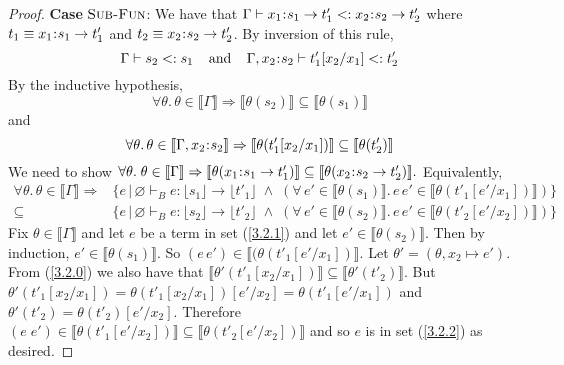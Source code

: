 \documentclass[11pt]{article}
\newcommand{\bind}{\hspace{0.05em}{:}\hspace{0.05em}} %
\newcommand{\lb}{\llbracket}         %
\newcommand{\rb}{\rrbracket}         %
\begin{document}
\begin{proof}
{\bf Case} $\textsc{Sub-Fun}$: We have that
$\Gamma \vdash x_1\bind s_1 \rightarrow t'_1 <: x_2\bind s_2 \rightarrow t'_2$ where $t_1 \equiv x_1\bind s_1 \rightarrow t'_1$ and $t_2 \equiv x_2\bind s_2 \rightarrow t'_2$. By inversion of this rule,
\[
\Gamma \vdash s_2 <: s_1 \;\;\;\;{\rm and}\;\;\;\;
\Gamma,x_2\bind s_2 \vdash t'_1[x_2/x_1] <: t'_2
\]
By the inductive hypothesis,
\[
\forall\theta.\, \theta \in \lb\Gamma\rb \Rightarrow
\lb\theta(s_2)\rb \subseteq\lb\theta(s_1)\rb 
\]
and
\begin{equation}\label{3.2.0}
\forall\theta.\, \theta \in \lb\Gamma, x_2\bind s_2\rb \Rightarrow
\lb\theta(t'_1[x_2/x_1])\rb \subseteq\lb\theta(t'_2)\rb 
\end{equation}
We need to show $\forall \theta.\; 
\theta \in \lb \Gamma \rb \Rightarrow 
\lb\theta(x_1\bind s_1\rightarrow t'_1)\rb \subseteq \lb\theta(x_2\bind s_2\rightarrow t'_2)\rb.$
Equivalently,
\begin{align} \label{3.2.1}
\forall\theta.\,\theta\in\lb\Gamma\rb \Rightarrow&
\{ e \,|\, \varnothing \vdash_B e:\lfloor s_1\rfloor \rightarrow \lfloor t'_1\rfloor \;\wedge\; 
  (\forall\, e' \in \lb \theta(s_1)\rb.\, e\,e' \in\lb \theta(t'_1[e'/x_1])\rb)\}\\
\subseteq &\{ e \,|\, \varnothing \vdash_B e:\lfloor s_2\rfloor \rightarrow \lfloor t'_2\rfloor \;\wedge\; 
  (\forall\, e' \in \lb \theta(s_2)\rb.\, e\,e' \in\lb \theta(t'_2[e'/x_2])\rb)\}\label{3.2.2}
\end{align}
Fix $\theta \in \lb\Gamma\rb$ and let $e$ be a term in set (\ref{3.2.1}) and let $e' \in \lb \theta(s_2)\rb$. Then by induction, $e' \in \lb \theta(s_1)\rb$. So $(e\, e') \in \lb(\theta(t'_1[e'/x_1])\rb$. Let $\theta' = (\theta, x_2 \mapsto e')$. From (\ref{3.2.0}) we also have that 
$\lb\theta'(t'_1[x_2/x_1])\rb \subseteq \lb\theta'(t'_2)\rb$.
But $\theta'(t'_1[x_2/x_1]) = \theta(t'_1[x_2/x_1])[e'/x_2] = \theta(t'_1[e'/x_1])$ and $\theta'(t'_2) = \theta(t'_2)[e'/x_2]$.
Therefore  $(e\; e') \in \lb \theta(t'_1[e'/x_2])\rb \subseteq \lb \theta(t'_2[e'/x_2])\rb$ and so $e$ is in set (\ref{3.2.2}) as desired.


\end{proof}
\end{document}
